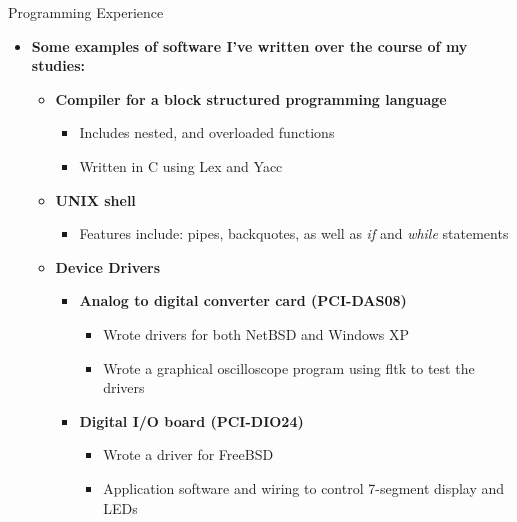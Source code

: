 \documentclass[11pt,oneside]{article}
\newenvironment{ressection}[1]{
	\vspace{4pt}
	{\fontfamily{phv}\selectfont\Large#1}
	\begin{itemize}
	\vspace{3pt}
}{
	\end{itemize}
}
\newcommand{\resitem}[1]{
	\vspace{-4pt}
	\item \begin{flushleft} #1 \end{flushleft}
}
\newcommand{\ressubitem}[1]{
	\vspace{-1pt}
	\item \begin{flushleft} #1 \end{flushleft}
}
\newenvironment{reslist}[1]{
	\resitem{\textbf{#1}}
	\begin{itemize}
}{
	\end{itemize}
}
\begin{document}
\begin{ressection}{Programming Experience}

  \begin{reslist}{Some examples of software I've written over the course of my studies:}
  \begin{reslist}{Compiler for a block structured programming language}
    \ressubitem{Includes nested, and overloaded functions}
    \ressubitem{Written in C using Lex and Yacc}
  \end{reslist}
  \begin{reslist}{UNIX shell}
    \ressubitem{Features include: pipes, backquotes, as well as \emph{if} and \emph{while} statements}
  \end{reslist}
   \begin{reslist}{Device Drivers}
    \begin{reslist}{Analog to digital converter card (PCI-DAS08)}
    \ressubitem{Wrote drivers for both NetBSD and Windows XP}
    \ressubitem{Wrote a graphical oscilloscope program using fltk to test the drivers}
    \end{reslist}
    \begin{reslist}{Digital I/O board (PCI-DIO24)}
      \ressubitem{Wrote a driver for FreeBSD}
      \ressubitem{Application software and wiring to control 7-segment display
	and LEDs}
    \end{reslist}
  \end{reslist}
  \end{reslist}

\end{ressection}
\end{document}
